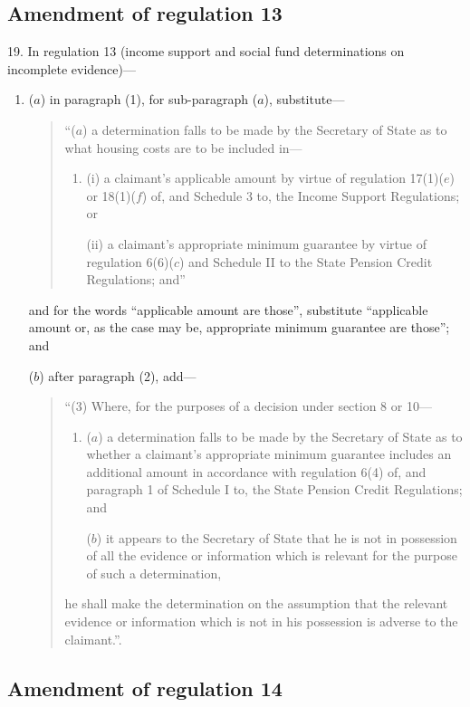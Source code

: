 \documentclass[12pt,a4paper]{article}
\begin{document}
\subsection[19. Amendment of regulation 13]{Amendment of regulation 13}

19.  In regulation 13 (income support and social fund determinations on incomplete evidence)—
\begin{enumerate}\item[]
($a$) in paragraph (1), for sub-paragraph ($a$), substitute—
\begin{quotation}
“($a$) a determination falls to be made by the Secretary of State as to what housing costs are to be included in—
\begin{enumerate}\item[]
(i) a claimant’s applicable amount by virtue of regulation 17(1)($e$)  or 18(1)($f$)  of, and Schedule 3 to, the Income Support Regulations; or

(ii) a claimant’s appropriate minimum guarantee by virtue of regulation 6(6)($c$)  and Schedule II to the State Pension Credit Regulations; and”
\end{enumerate}
\end{quotation}
    and for the words “applicable amount are those”, substitute “applicable amount or, as the case may be, appropriate minimum guarantee are those”; and 

($b$) after paragraph (2), add—
\begin{quotation}
“(3) Where, for the purposes of a decision under section 8 or 10—
\begin{enumerate}\item[]
($a$) a determination falls to be made by the Secretary of State as to whether a claimant’s appropriate minimum guarantee includes an additional amount in accordance with regulation 6(4) of, and paragraph 1 of Schedule I to, the State Pension Credit Regulations; and

($b$) it appears to the Secretary of State that he is not in possession of all the evidence or information which is relevant for the purpose of such a determination,
\end{enumerate}
he shall make the determination on the assumption that the relevant evidence or information which is not in his possession is adverse to the claimant.”.
\end{quotation}
\end{enumerate}

\subsection[20. Amendment of regulation 14]{Amendment of regulation 14}
\end{document}
